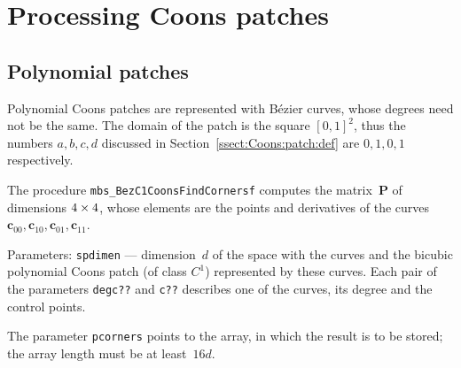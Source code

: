

\newpage
\section{\label{sect:Coons:patch:procedures}Processing Coons patches}

\subsection{Polynomial patches}

Polynomial Coons patches are represented with B\'{e}zier curves, whose degrees
need not be the same. The domain of the patch is the square $[0,1]^2$,
thus the numbers $a,b,c,d$ discussed in Section~\ref{ssect:Coons:patch:def}
are $0,1,0,1$ respectively.

\vspace{\bigskipamount}
\begin{sloppypar}
The procedure \texttt{mbs\_BezC1CoonsFindCornersf} computes the matrix~$\bm{P}$
of dimensions $4\times\nobreak 4$, whose elements are the points and derivatives
of the curves $\bm{c}_{00},\bm{c}_{10},\bm{c}_{01},\bm{c}_{11}$.%
\end{sloppypar}

Parameters: \texttt{spdimen} --- dimension~$d$ of the space with the
curves and the bicubic polynomial Coons patch (of class $C^1$) represented
by these curves. Each pair of the parameters \texttt{degc??} and \texttt{c??}    
describes one of the curves, its degree and the control points.

The parameter \texttt{pcorners} points to the array, in which the result
is to be stored; the array length must be at least~$16d$.

